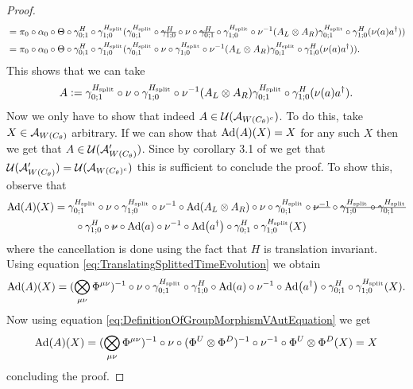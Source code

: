 \documentclass[11pt,a4paper,twoside]{article}
\numberwithin{equation}{section}
\begin{document}
\begin{proof}
		\begin{align}
			&=\pi_0\circ\alpha_0\circ\Theta\circ\gamma^H_{0;1}\circ\gamma^{\Hsplit}_{1;0}(\gamma^{\Hsplit}_{0;1}\circ\stkout{\gamma^H_{1;0}}\circ\nu\circ\stkout{\gamma^H_{0;1}}\circ\gamma^{\Hsplit}_{1;0}\circ\nu^{-1}(A_L\otimes A_R)\gamma^{\Hsplit}_{0;1}\circ\gamma^H_{1;0}(\nu(a)a^\dagger))\\
			&=\pi_0\circ\alpha_0\circ\Theta\circ\gamma^H_{0;1}\circ\gamma^{\Hsplit}_{1;0}(\gamma^{\Hsplit}_{0;1}\circ\nu\circ\gamma^{\Hsplit}_{1;0}\circ\nu^{-1}(A_L\otimes A_R)\gamma^{\Hsplit}_{0;1}\circ\gamma^H_{1;0}(\nu(a)a^\dagger)).
		\end{align}
		This shows that we can take
		\begin{equation}
			A\defeq \gamma^{\Hsplit}_{0;1}\circ\nu\circ\gamma^{\Hsplit}_{1;0}\circ\nu^{-1}(A_L\otimes A_R)\gamma^{\Hsplit}_{0;1}\circ\gamma^H_{1;0}(\nu(a)a^\dagger).
		\end{equation}
		Now we only have to show that indeed $A\in\UU(\AA_{W(C_\theta)^c})$. To do this, take $X\in\AA_{W(C_\theta)}$ arbitrary. If we can show that $\Ad{A}(X)=X$ for any such $X$ then we get that $A\in\UU(\AA_{W(C_\theta)}')$. Since by corollary 3.1 of \cite{NaScWe_2013} we get that $\UU(\AA_{W(C_\theta)}')=\UU(\AA_{W(C_\theta)^c})$ this is sufficient to conclude the proof. To show this, observe that
		\begin{align}
			\Ad{A}(X)&=\gamma^{\Hsplit}_{0;1}\circ\nu\circ\gamma^{\Hsplit}_{1;0}\circ\nu^{-1}\circ\Ad{A_L\otimes A_R}\circ\nu\circ\gamma^{\Hsplit}_{0;1}\circ\stkout{\nu^{-1}}\circ\stkout{\gamma^{\Hsplit}_{1;0}\circ\gamma^{\Hsplit}_{0;1}}\\
			&\nonumber
			\qquad\circ\gamma^H_{1;0}\circ\stkout{\nu}\circ\Ad{a}\circ\nu^{-1}\circ\Ad{a^\dagger}\circ\gamma^H_{0;1}\circ\gamma^{\Hsplit}_{1;0}(X)
		\end{align}
		where the cancellation is done using the fact that $H$ is translation invariant. Using equation \eqref{eq:TranslatingSplittedTimeEvolution} we obtain
		\begin{equation}
			\Ad{A}(X)=(\bigotimes_{\mu\nu}\Phi^{\mu\nu})^{-1}\circ\nu\circ\gamma^{\Hsplit}_{0;1}\circ\gamma^H_{1;0}\circ\Ad{a}\circ\nu^{-1}\circ\Ad{a^\dagger}\circ\gamma^H_{0;1}\circ\gamma^{\Hsplit}_{1;0}(X).
		\end{equation}
		Now using equation \eqref{eq:DefinitionOfGroupMorphismVAutEquation} we get
		\begin{equation}
			\Ad{A}(X)=(\bigotimes_{\mu\nu}\Phi^{\mu\nu})^{-1}\circ\nu\circ(\Phi^U\otimes\Phi^D)^{-1}\circ\nu^{-1}\circ\Phi^U\otimes\Phi^D(X)=X
		\end{equation}
		concluding the proof.
	\end{proof}
\end{document}
